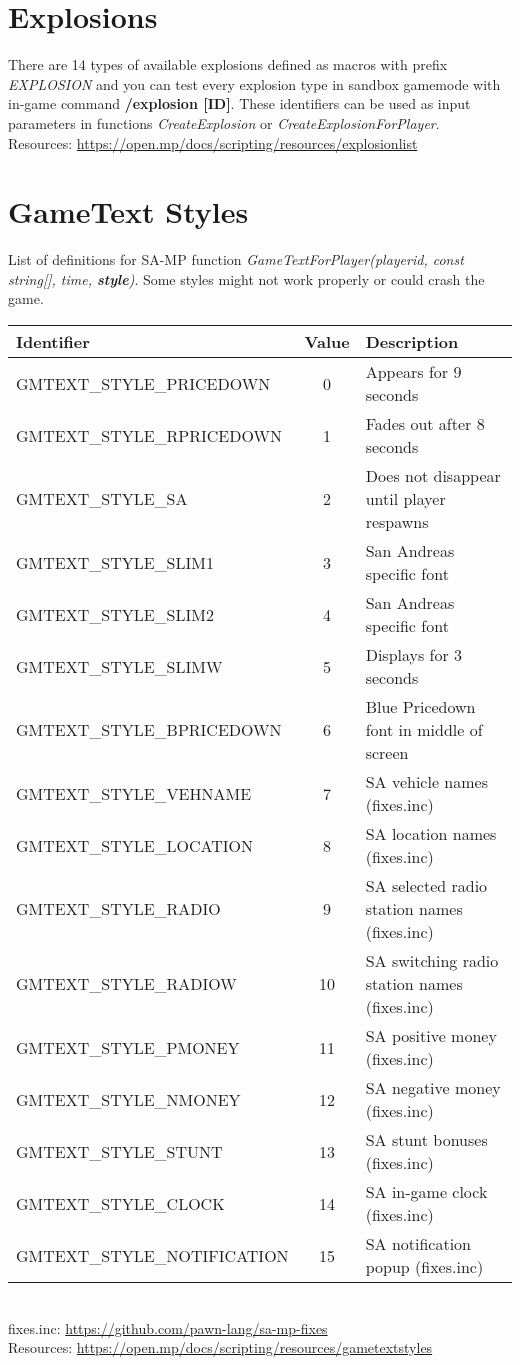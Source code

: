 \documentclass{article}
\begin{document}
\section{Explosions}
There are 14 types of available explosions defined as macros with prefix \textit{EXPLOSION} and you can test every explosion type in sandbox gamemode with in-game command \textbf{/explosion [ID]}. These identifiers can be used as input parameters in functions \textit{CreateExplosion} or \textit{CreateExplosionForPlayer}.
\bigskip
\\Resources: \url{https://open.mp/docs/scripting/resources/explosionlist}


\newpage
\section{GameText Styles}
\begin{sloppypar}
List of definitions for SA-MP function \textit{GameTextForPlayer(playerid, const string[], time, \textbf{style})}. Some styles might not work properly or could crash the game.
\end{sloppypar}
\bigskip
\noindent\begin{tabular}{ |l|c|l| } 
\hline
Identifier & Value & Description \\
\hline
GMTEXT\_STYLE\_PRICEDOWN & 0 & Appears for 9 seconds \\
GMTEXT\_STYLE\_RPRICEDOWN & 1 & Fades out after 8 seconds \\
GMTEXT\_STYLE\_SA & 2 & Does not disappear until player respawns \\
GMTEXT\_STYLE\_SLIM1 & 3 & San Andreas specific font \\
GMTEXT\_STYLE\_SLIM2 & 4 & San Andreas specific font \\
GMTEXT\_STYLE\_SLIMW & 5 & Displays for 3 seconds \\
GMTEXT\_STYLE\_BPRICEDOWN & 6 & Blue Pricedown font in middle of screen \\
GMTEXT\_STYLE\_VEHNAME & 7 & SA vehicle names (fixes.inc) \\
GMTEXT\_STYLE\_LOCATION & 8 & SA location names (fixes.inc) \\
GMTEXT\_STYLE\_RADIO & 9 & SA selected radio station names (fixes.inc) \\
GMTEXT\_STYLE\_RADIOW & 10 & SA switching radio station names (fixes.inc) \\
GMTEXT\_STYLE\_PMONEY & 11 & SA positive money (fixes.inc) \\
GMTEXT\_STYLE\_NMONEY & 12 & SA negative money (fixes.inc) \\
GMTEXT\_STYLE\_STUNT & 13 & SA stunt bonuses (fixes.inc) \\
GMTEXT\_STYLE\_CLOCK & 14 & SA in-game clock (fixes.inc) \\
GMTEXT\_STYLE\_NOTIFICATION & 15 & SA notification popup (fixes.inc) \\
\hline
\end{tabular}
\bigskip
\\fixes.inc: \url{https://github.com/pawn-lang/sa-mp-fixes}
\bigskip
\\Resources: \url{https://open.mp/docs/scripting/resources/gametextstyles}
\end{document}
